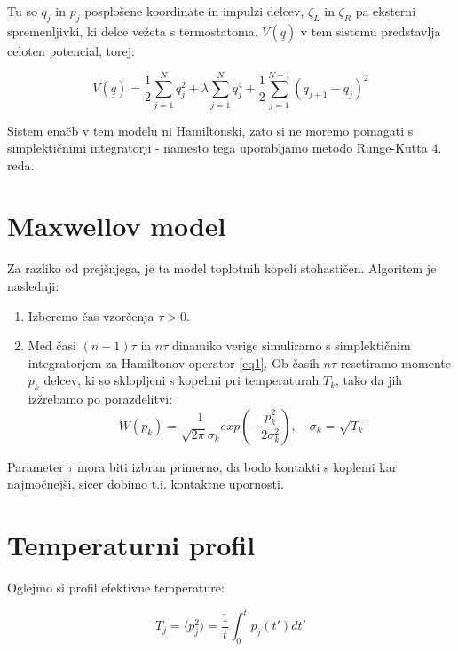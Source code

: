 \documentclass[a4paper]{article}
\newcommand{\half}{\frac{1}{2}}
\newcommand{\q}{\underline{q}}
\begin{document}
    Tu so $q_j$ in $p_j$ posplošene koordinate in impulzi delcev, $\zeta_L$ in $\zeta_R$ pa eksterni spremenljivki, ki
    delce vežeta s termostatoma. $V(\q)$ v tem sistemu predstavlja celoten potencial, torej:

    \begin{equation}\label{eq4}
        V(\q) = \half \sum_{j=1}^N q_j^2 + \lambda \sum_{j=1}^N q_j^4 + \half \sum_{j=1}^{N-1} (q_{j+1} - q_j)^2
    \end{equation}

    Sistem enačb v tem modelu ni Hamiltonski, zato si ne moremo pomagati s simplektičnimi integratorji - namesto tega
    uporabljamo metodo Runge-Kutta $4.$ reda.

    \section{Maxwellov model}

    Za razliko od prejšnjega, je ta model toplotnih kopeli stohastičen.
    Algoritem je naslednji:

    \begin{enumerate}
        \item Izberemo čas vzorčenja $\tau > 0$.
        \item Med časi $(n - 1)\tau$ in $n\tau$ dinamiko verige simuliramo s simplektičnim integratorjem za Hamiltonov
        operator \ref{eq1}.
        Ob časih $n\tau$ resetiramo momente $p_k$ delcev, ki so sklopljeni s kopelmi pri temperaturah $T_k$, tako da
        jih izžrebamo po porazdelitvi:
        \begin{equation}\label{eq5}
            W(p_k) = \frac{1}{\sqrt{2\pi}\sigma_k} exp\left( -\frac{p_k^2}{2\sigma_k^2} \right),
            \quad \sigma_k = \sqrt{T_k}
        \end{equation}
    \end{enumerate}

    Parameter $\tau$ mora  biti  izbran  primerno,  da  bodo  kontakti  s  koplemi  kar najmočnejši, sicer dobimo t.i.
    kontaktne upornosti.

    \section{Temperaturni profil}

    Oglejmo si profil efektivne temperature:

    \begin{equation}\label{eq6}
        T_j = \langle p_j^2 \rangle = \frac{1}{t} \int_0^t p_j(t') dt'
    \end{equation}
\end{document}
